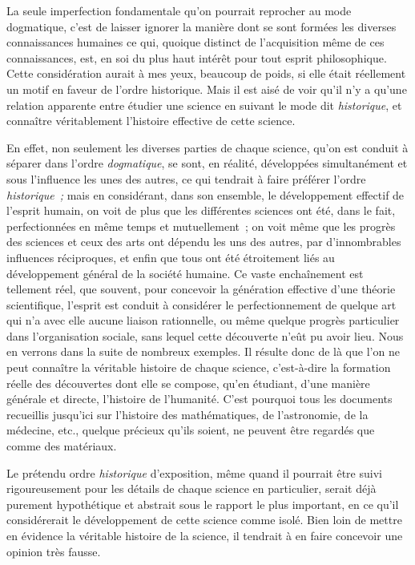 \documentclass[french,twoside]{book} %
\begin{document}
La seule imperfection fondamentale qu’on pourrait reprocher au mode dogmatique, c’est de laisser ignorer la manière dont se sont formées les diverses connaissances humaines ce qui, quoique distinct de l’acquisition même de ces connaissances, est, en soi du plus haut intérêt pour tout esprit philosophique. Cette considération aurait à mes yeux, beaucoup de poids, si elle était réellement un motif en faveur de l’ordre historique. Mais il est aisé de voir qu’il n’y a qu’une relation apparente entre étudier une science en suivant le mode dit {\itshape historique}, et connaître véritablement l’histoire effective de cette science.\par
En effet, non seulement les diverses parties de chaque science, qu’on est conduit à séparer dans l’ordre {\itshape dogmatique}, se sont, en réalité, développées simultanément et sous l’influence les unes des autres, ce qui tendrait à faire préférer l’ordre {\itshape historique ;} mais en considérant, dans son ensemble, le développement effectif de l’esprit humain, on voit de plus que les différentes sciences ont été, dans le fait, perfectionnées en même temps et mutuellement ; on voit même que les progrès des sciences et ceux des arts ont dépendu les uns des autres, par d’innombrables influences réciproques, et enfin que tous ont été étroitement liés au développement général de la société humaine. Ce vaste enchaînement est tellement réel, que souvent, pour concevoir la génération effective d’une théorie scientifique, l’esprit est conduit à considérer le perfectionnement de quelque art qui n’a avec elle aucune liaison rationnelle, ou même quelque progrès particulier dans l’organisation sociale, sans lequel cette découverte n’eût pu avoir lieu. Nous en verrons dans la suite de nombreux exemples. Il résulte donc de là que l’on ne peut connaître la véritable histoire de chaque science, c’est-à-dire la formation réelle des découvertes dont elle se compose, qu’en étudiant, d’une manière générale et directe, l’histoire de l’humanité. C’est pourquoi tous les documents recueillis jusqu’ici sur l’histoire des mathématiques, de l’astronomie, de la médecine, etc., quelque précieux qu’ils soient, ne peuvent être regardés que comme des matériaux.\par
Le prétendu ordre {\itshape historique} d’exposition, même quand il pourrait être suivi rigoureusement pour les détails de chaque science en particulier, serait déjà purement hypothétique et abstrait sous le rapport le plus important, en ce qu’il considérerait le développement de cette science comme isolé. Bien loin de mettre en évidence la véritable histoire de la science, il tendrait à en faire concevoir une opinion très fausse.\par
\end{document}
